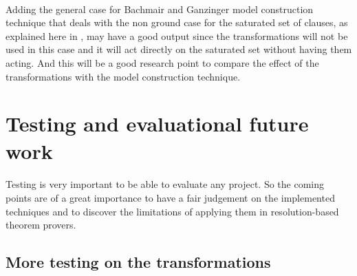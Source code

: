 			\paragraph{ }
			Adding the general case for Bachmair and Ganzinger model construction technique that deals with the non ground %
		case for the saturated set of clauses, as explained here in \cite{BGMC}, may have a good output since the transformations will not be used in this case and it will act directly on the saturated set without having them acting. And this will be a good research point to compare the effect of the transformations with the model construction technique.
		
		
	\section{Testing and evaluational future work}\label{sec:c7s2}
		\paragraph{ }
		Testing is very important to be able to evaluate any project. So the coming points are of a great importance to have a fair judgement on the implemented techniques and to discover the limitations of applying them in resolution-based theorem provers.
		
		\begin{comment}
		\subsection{Testing validation of transformations on a server}\label{sub:c7s2s1}
			\paragraph{ }
			Running the script of validation of the transformations over medium sized and large sized problems on a large server would be of a great importance. Since only a personal computer of 4 GB RAM were used in the testing so only small sized problems were able to run on it without crashing. And the results of these validations is important to have a full overview on the performance and the impact of the project specially on those problems in the \ac{epr} set that were not terminating in the original configurations. Only after that we could have a fair evaluation on the project.  
		\end{comment}		
		
		\subsection{More testing on the transformations}\label{sub:c7s2s2}
